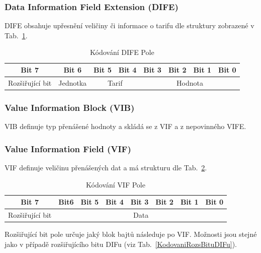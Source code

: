 \subsubsection{Data Information Field Extension (DIFE)}
DIFE obsahuje upřesnění veličiny či informace o tarifu dle struktury zobrazené v Tab.~\ref{KodovaniDIFE}.

\begin{table}[!ht]
\centering
\caption{Kódování DIFE Pole}
\label{KodovaniDIFE}
\begin{tabular}{|c|c|c|c|c|c|c|c|}
\hline \hline
\textbf{Bit 7}  & \textbf{Bit 6} & \textbf{Bit 5} & \textbf{Bit 4} & \textbf{Bit 3} & \textbf{Bit 2} & \textbf{Bit 1} & \textbf{Bit 0} \\ \hline 
Rozšiřující bit & Jednotka       & \multicolumn{2}{c|}{Tarif}      & \multicolumn{4}{c|}{Hodnota}                                      \\ \hline \hline
\end{tabular}
\end{table}

\subsubsection{Value Information Block (VIB)}
VIB definuje typ přenášené hodnoty a skládá se z VIF a z nepovinného VIFE.

\subsubsection{Value Information Field (VIF)}
VIF definuje veličinu přenášených dat a má strukturu dle Tab.~\ref{KodovaniVIFu}.

\newpage

\begin{table}[!ht]
\centering
\caption{Kódování VIF Pole}
\label{KodovaniVIFu}
\begin{tabular}{|c|c|c|c|c|c|c|c|}
\hline \hline
\textbf{Bit 7}  & \textbf{Bit6} & \textbf{Bit 5} & \textbf{Bit 4} & \textbf{Bit 3} & \textbf{Bit 2} & \textbf{Bit 1} & \textbf{Bit 0} \\ \hline 
Rozšiřující bit & \multicolumn{7}{c|}{Data}                                                                                           \\ \hline \hline
\end{tabular}
\end{table}

Rozšiřující bit pole určuje jaký blok bajtů následuje po VIF. Možnosti jsou stejné jako v případě rozšiřujícího bitu DIFu (viz Tab.~\ref{KodovaniRozsBituDIFu}).

